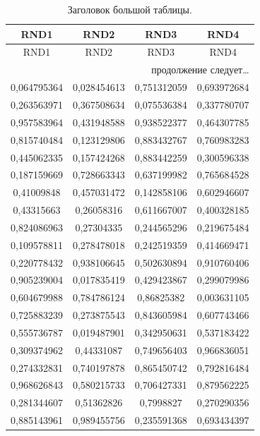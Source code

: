 \documentclass[a4paper, 12pt]{article}
\begin{document}
\begin{longtable}{|c|c|c|c|}
    \caption{Заголовок большой таблицы.}\\
    \hline
    \textbf{RND1} & \textbf{RND2} & \textbf{RND3} & \textbf{RND4} \\ \hline
    \endfirsthead
    \hline
    RND1 & RND2 & RND3 & RND4 \\ \hline
    \endhead
    \hline
    \multicolumn{4}{r}{продолжение следует\ldots} \
    \endfoot
    \hline
    \endlastfoot
    
    0,576745371 & 0,435853468 & 0,36384912 & 0,299047979 \\ 
    0,064795364 & 0,028454613 & 0,751312059 & 0,693972684 \\
    0,263563971 & 0,367508634 & 0,075536384 & 0,337780707 \\
    0,957583964 & 0,431948588 & 0,938522377 & 0,464307785 \\
    0,815740484 & 0,123129806 & 0,883432767 & 0,760983283 \\
    0,445062335 & 0,157424268 & 0,883442259 & 0,300596338 \\
    0,187159669 & 0,728663343 & 0,637199982 & 0,765684528 \\
    0,41009848 & 0,457031472 & 0,142858106 & 0,602946607 \\
    0,43315663 & 0,26058316 & 0,611667007 & 0,400328185 \\
    0,824086963 & 0,27304335 & 0,244565296 & 0,219675484 \\
    0,109578811 & 0,278478018 & 0,242519359 & 0,414669471 \\
    0,220778432 & 0,938106645 & 0,502630894 & 0,910760406 \\
    0,905239004 & 0,017835419 & 0,429423867 & 0,299079986 \\
    0,604679988 & 0,784786124 & 0,86825382 & 0,003631105 \\
    0,725883239 & 0,273875543 & 0,843605984 & 0,607743466 \\
    0,555736787 & 0,019487901 & 0,342950631 & 0,537183422 \\
    0,309374962 & 0,44331087 & 0,749656403 & 0,966836051 \\
    0,274332831 & 0,740197878 & 0,865450742 & 0,792816484 \\
    0,968626843 & 0,580215733 & 0,706427331 & 0,879562225 \\
    0,281344607 & 0,51362826 & 0,7998827 & 0,270290356 \\
    0,885143961 & 0,989455756 & 0,235591368 & 0,693434397 \\

\end{longtable}
\end{document}

